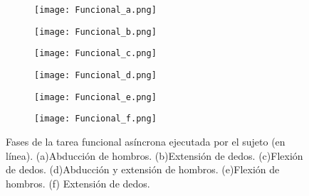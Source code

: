 \begin{figure}[htbp]
	\centering
	\begin{subfigure}[htbp]{0.45\textwidth}
		\texttt{[image: Funcional\_a.png]}
		\caption{}
		\label{Figura: Fun_A}
	\end{subfigure}
	\begin{subfigure}[htbp]{0.45\textwidth}
		\texttt{[image: Funcional\_b.png]}
		\caption{}
		\label{Figura: Fun_B}
	\end{subfigure}
	\newline
	\begin{subfigure}[htbp]{0.45\textwidth}
		\texttt{[image: Funcional\_c.png]}
		\caption{}
		\label{Figura: Fun_C}
	\end{subfigure}
	\begin{subfigure}[htbp]{0.45\textwidth}
		\texttt{[image: Funcional\_d.png]}
		\caption{}
		\label{Figura: Fun_D}
	\end{subfigure}
	\newline
	\begin{subfigure}[htbp]{0.45\textwidth}
		\texttt{[image: Funcional\_e.png]}
		\caption{}
		\label{Figura: Fun_E}
	\end{subfigure}
	\begin{subfigure}[htbp]{0.45\textwidth}
		\texttt{[image: Funcional\_f.png]}
		\caption{}
		\label{Figura: Fun_F}
	\end{subfigure}
	\caption[Fases de la tarea funcional asíncrona ejecutada por el sujeto (en línea)]{Fases de la tarea funcional asíncrona ejecutada por el sujeto (en línea). (a)Abducción de hombros. (b)Extensión de dedos. (c)Flexión de dedos. (d)Abducción y extensión de hombros. (e)Flexión de hombros. (f) Extensión de dedos.}
	\label{Figura: TareaFuncional}
\end{figure}

